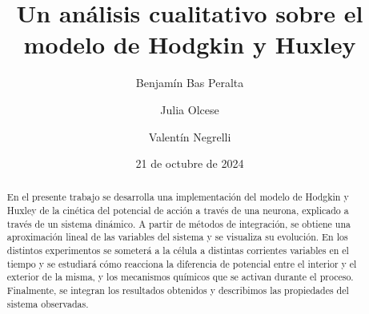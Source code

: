 \documentclass[aps,twocolumn,groupedaddress]{revtex4-2}
\begin{document}

\title{
Un an\'alisis cualitativo sobre el modelo de Hodgkin y Huxley
}


\author{Benjamín Bas Peralta}

\author{Julia Olcese}

\author{Valentín Negrelli}

\date{21 de octubre de 2024}

\begin{abstract}
En el presente trabajo se desarrolla una implementación del modelo de Hodgkin y Huxley de la cinética del potencial de acción a través de una neurona, explicado a través de un sistema dinámico. A partir de métodos de integración, se obtiene una aproximación lineal de las variables del sistema y se visualiza su evolución. En los distintos experimentos se someterá a la célula a distintas corrientes variables en el tiempo y se estudiará cómo reacciona la diferencia de potencial entre el interior y el exterior de la misma, y los mecanismos químicos que se activan durante el proceso. Finalmente, se integran los resultados obtenidos y describimos las propiedades del sistema observadas.

\end{abstract}
\end{document}
